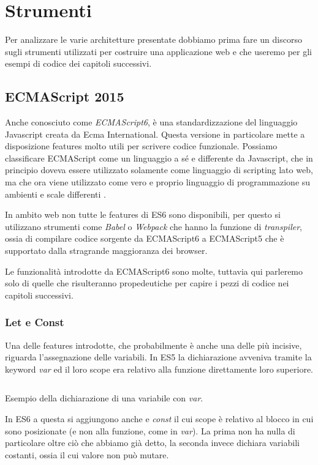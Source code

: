 \chapter{Strumenti}
Per analizzare le varie architetture presentate dobbiamo prima fare un discorso sugli strumenti utilizzati per costruire una applicazione web e che useremo per gli esempi di codice dei capitoli successivi.

\section{ECMAScript 2015}
Anche conosciuto come \textit{ECMAScript6}, è una standardizzazione del linguaggio Javascript creata da Ecma International. Questa versione in particolare mette a disposizione features molto utili per scrivere codice funzionale. Possiamo classificare ECMAScript come un linguaggio a sé e differente da Javascript, che in principio doveva essere utilizzato solamente come linguaggio di scripting lato web, ma che ora viene utilizzato come vero e proprio linguaggio di programmazione su ambienti e scale differenti \cite{ECMAScriptDocumentation}.

In ambito web non tutte le features di ES6 sono disponibili, per questo si utilizzano strumenti come \textit{Babel} o \textit{Webpack} che hanno la funzione di \textit{transpiler}, ossia di compilare codice sorgente da ECMAScript6 a ECMAScript5 che è supportato dalla stragrande maggioranza dei browser.

Le funzionalità introdotte da ECMAScript6 sono molte, tuttavia qui parleremo solo di quelle che risulteranno propedeutiche per capire i pezzi di codice nei capitoli successivi.

\subsection{Let e Const}
Una delle features introdotte, che probabilmente è anche una delle più incisive, riguarda l'assegnazione delle variabili. In ES5 la dichiarazione avveniva tramite la keyword \textit{var} ed il loro scope era relativo alla funzione direttamente loro superiore.
 
\begin{listing}[ht]
\inputminted{Javascript}{sources/exampleVarES5.js}
\caption{Esempio della dichiarazione di una variabile con \textit{var}.}
\end{listing}

\noindent
In ES6 a questa si aggiungono anche  e \textit{const} il cui scope è relativo al blocco in cui sono posizionate (e non alla funzione, come in \textit{var}). La prima non ha nulla di particolare oltre ciò che abbiamo già detto, la seconda invece dichiara variabili costanti, ossia il cui valore non può mutare.

